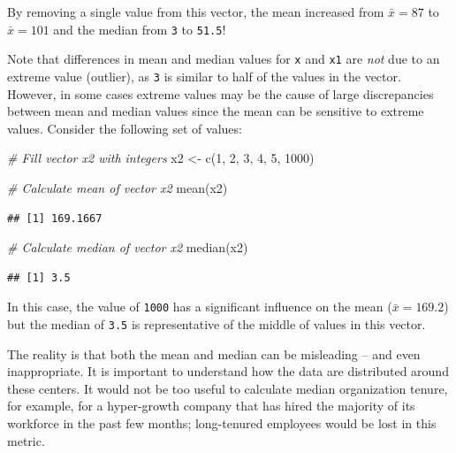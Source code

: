 \documentclass[
]{book}
\newenvironment{Shaded}{\begin{snugshade}}{\end{snugshade}}
\newcommand{\CommentTok}[1]{\textcolor[rgb]{0.56,0.35,0.01}{\textit{#1}}}
\newcommand{\DecValTok}[1]{\textcolor[rgb]{0.00,0.00,0.81}{#1}}
\newcommand{\FunctionTok}[1]{\textcolor[rgb]{0.00,0.00,0.00}{#1}}
\newcommand{\NormalTok}[1]{#1}
\newcommand{\OtherTok}[1]{\textcolor[rgb]{0.56,0.35,0.01}{#1}}
\begin{document}
By removing a single value from this vector, the mean increased from \(\bar{x} = 87\) to \(\bar{x} = 101\) and the median from \texttt{3} to \texttt{51.5}!

Note that differences in mean and median values for \texttt{x} and \texttt{x1} are \emph{not} due to an extreme value (outlier), as \texttt{3} is similar to half of the values in the vector. However, in some cases extreme values may be the cause of large discrepancies between mean and median values since the mean can be sensitive to extreme values. Consider the following set of values:

\begin{Shaded}
\begin{Highlighting}[]
\CommentTok{\# Fill vector x2 with integers}
\NormalTok{x2 }\OtherTok{\textless{}{-}} \FunctionTok{c}\NormalTok{(}\DecValTok{1}\NormalTok{, }\DecValTok{2}\NormalTok{, }\DecValTok{3}\NormalTok{, }\DecValTok{4}\NormalTok{, }\DecValTok{5}\NormalTok{, }\DecValTok{1000}\NormalTok{)}
\end{Highlighting}
\end{Shaded}

\begin{Shaded}
\begin{Highlighting}[]
\CommentTok{\# Calculate mean of vector x2}
\FunctionTok{mean}\NormalTok{(x2)}
\end{Highlighting}
\end{Shaded}

\begin{verbatim}
## [1] 169.1667
\end{verbatim}

\begin{Shaded}
\begin{Highlighting}[]
\CommentTok{\# Calculate median of vector x2}
\FunctionTok{median}\NormalTok{(x2)}
\end{Highlighting}
\end{Shaded}

\begin{verbatim}
## [1] 3.5
\end{verbatim}

In this case, the value of \texttt{1000} has a significant influence on the mean (\(\bar{x} = 169.2\)) but the median of \texttt{3.5} is representative of the middle of values in this vector.

The reality is that both the mean and median can be misleading -- and even inappropriate. It is important to understand how the data are distributed around these centers. It would not be too useful to calculate median organization tenure, for example, for a hyper-growth company that has hired the majority of its workforce in the past few months; long-tenured employees would be lost in this metric.
\end{document}
